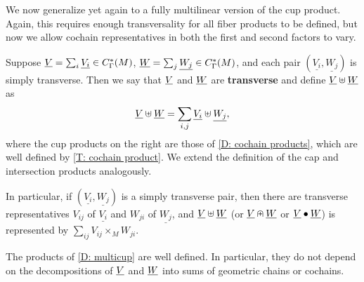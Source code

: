 We now generalize yet again to a fully multilinear version of the cup product. Again, this requires enough transversality for all fiber products to be defined, but now we allow cochain representatives in both the first and second factors to vary.

\begin{definition}\label{D: multicup}
Suppose $\underline{V}=\sum_i \underline{V_i}\in C_\Gamma^*(M)$, $\underline{W}=\sum_j \underline{W_j}\in C_\Gamma^*(M)$, and each pair $(\underline{V_i},\underline{W_j})$ is simply transverse. Then we say that $\underline{V}$ and $\underline{W}$ are \textbf{transverse} and define $\underline{V}\uplus\underline{W}$ as
$$\underline{V}\uplus\underline{W}=\sum_{i,j} \underline{V_i}\uplus \underline{W_j},$$
where the cup products on the right are those of \cref{D: cochain products}, which are well defined by \cref{T: cochain product}.
We extend the definition of the cap and intersection products analogously.

In particular, if $(\underline{V_i},\underline{W_j})$ is a simply transverse pair, then there are transverse representatives $V_{ij}$ of $\underline{V_i}$ and $W_{ji}$ of $\underline{W_j}$, and $\underline{V}\uplus \underline{W}$ (or $\underline{V}\nplus \underline{W}$ or $\underline{V}\bullet\underline{W}$) is represented by $\sum_{ij}V_{ij}\times_M W_{ji}$.
\end{definition}



\begin{theorem}\label{T: multicup}
The products of \cref{D: multicup} are well defined. In particular, they do not depend on the decompositions of $\underline{V}$ and $\underline{W}$ into sums of geometric chains or cochains.
\end{theorem}

